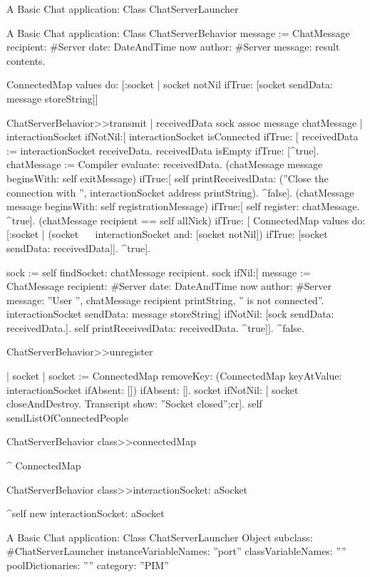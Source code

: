 \documentclass[a4paper,10pt,twoside]{book}
\begin{document}
\begin{script}{A Basic Chat application: Class ChatServerLauncher}
\begin{classdef}{A Basic Chat application: Class ChatServerBehavior}
	message := ChatMessage
					recipient: #Server
					date: DateAndTime now
					author: #Server
					message: result contents.

	ConnectedMap values do: [:socket |
		socket notNil
			ifTrue: [socket sendData: message storeString]]

ChatServerBehavior>>transmit
	| receivedData  sock assoc message chatMessage |
	interactionSocket ifNotNil:[
		interactionSocket isConnected 
			ifTrue: [	
				receivedData := interactionSocket receiveData.
				receivedData isEmpty ifTrue: [^true].
				chatMessage := Compiler evaluate: receivedData.
				(chatMessage message beginsWith: self exitMessage) 
					ifTrue:[
						self printReceivedData: (''Close the connection with '', interactionSocket address printString).
						^false].
				(chatMessage message beginsWith: self registrationMessage)
					ifTrue:[
						self register: chatMessage.
						^true].
				(chatMessage recipient == self allNick)
					ifTrue: [
						ConnectedMap values do: [:socket |
							(socket ~~ interactionSocket and: [socket notNil])
								ifTrue: [socket sendData: receivedData]].
						^true].
				
				sock := self findSocket: chatMessage recipient.
				sock 
					ifNil:[
						message := ChatMessage
										recipient: #Server
										date: DateAndTime now
										author: #Server
										message: ''User '', chatMessage recipient printString, '' is not connected''.
						interactionSocket sendData: message storeString]
					ifNotNil: [sock sendData: receivedData.].
				self printReceivedData: receivedData.
				^true]].
	^false.

ChatServerBehavior>>unregister

	| socket |
	socket := ConnectedMap removeKey: (ConnectedMap keyAtValue: interactionSocket ifAbsent: []) ifAbsent: [].
	socket ifNotNil: [
		 socket closeAndDestroy.
		Transcript show: ''Socket closed'';cr].
	self sendListOfConnectedPeople

ChatServerBehavior class>>connectedMap

	^ ConnectedMap

ChatServerBehavior class>>interactionSocket: aSocket

	^self new interactionSocket: aSocket
\end{classdef}


\begin{classdef}{A Basic Chat application: Class ChatServerLauncher}
Object subclass: #ChatServerLauncher
	instanceVariableNames: ''port''
	classVariableNames: ''''
	poolDictionaries: ''''
	category: ''PIM''


\end{classdef}
\end{script}
\end{document}
